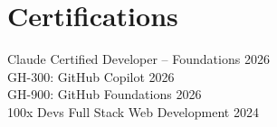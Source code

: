 \section{Certifications}
\begin{itemize}[leftmargin=0.15in, label={}]
    \small{
        \item{
            Claude Certified Developer -- Foundations \hfill 2026 \\
            GH-300: GitHub Copilot \hfill 2026 \\
            GH-900: GitHub Foundations \hfill 2026 \\
            100x Devs Full Stack Web Development \hfill 2024
        }
    }
\end{itemize}